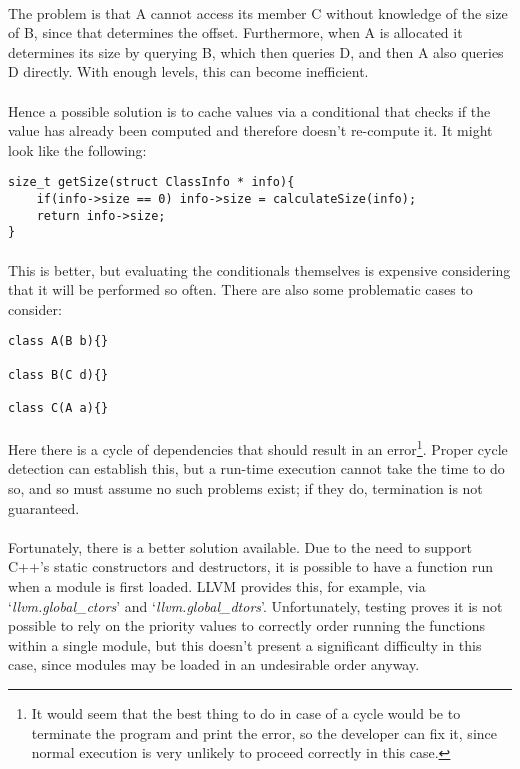\documentclass{article}
\begin{document}
\paragraph{}
The problem is that A cannot access its member C without knowledge of the size of B, since that determines the offset. Furthermore, when A is allocated it determines its size by querying B, which then queries D, and then A also queries D directly. With enough levels, this can become inefficient.

\paragraph{}
Hence a possible solution is to cache values via a conditional that checks if the value has already been computed and therefore doesn't re-compute it. It might look like the following:

\begin{lstlisting}
size_t getSize(struct ClassInfo * info){
	if(info->size == 0) info->size = calculateSize(info);
	return info->size;
}
\end{lstlisting}

\paragraph{}
This is better, but evaluating the conditionals themselves is expensive considering that it will be performed so often. There are also some problematic cases to consider:

\begin{lstlisting}
class A(B b){}

class B(C d){}

class C(A a){}
\end{lstlisting}

\paragraph{}
Here there is a cycle of dependencies that should result in an error\footnote{It would seem that the best thing to do in case of a cycle would be to terminate the program and print the error, so the developer can fix it, since normal execution is very unlikely to proceed correctly in this case.}. Proper cycle detection can establish this, but a run-time execution cannot take the time to do so, and so must assume no such problems exist; if they do, termination is not guaranteed.

\paragraph{}
Fortunately, there is a better solution available. Due to the need to support C++'s static constructors and destructors, it is possible to have a function run when a module is first loaded. LLVM provides this, for example, via `\emph{llvm.global\_ctors}' and `\emph{llvm.global\_dtors}'. Unfortunately, testing proves it is not possible to rely on the priority values to correctly order running the functions within a single module, but this doesn't present a significant difficulty in this case, since modules may be loaded in an undesirable order anyway.
\end{document}
